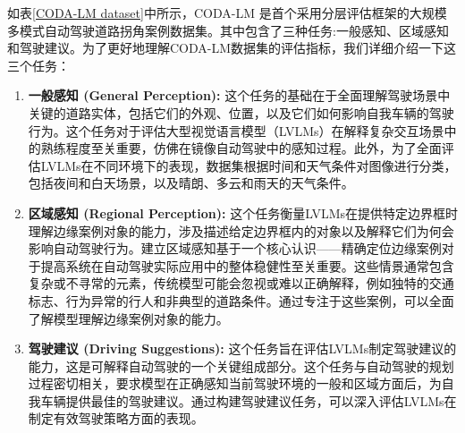 \documentclass[
    linespread = 1.25
]{ctexart}
\begin{document}
如表\ref{CODA-LM dataset}中所示，CODA-LM 是首个采用分层评估框架的大规模多模式自动驾驶道路拐角案例数据集。其中包含了三种任务:一般感知、区域感知和驾驶建议。为了更好地理解CODA-LM数据集的评估指标，我们详细介绍一下这三个任务：

\begin{enumerate}
  \item \textbf{一般感知 (General Perception):}
        这个任务的基础在于全面理解驾驶场景中关键的道路实体，包括它们的外观、位置，以及它们如何影响自我车辆的驾驶行为。这个任务对于评估大型视觉语言模型（LVLMs）在解释复杂交互场景中的熟练程度至关重要，仿佛在镜像自动驾驶中的感知过程。此外，为了全面评估LVLMs在不同环境下的表现，数据集根据时间和天气条件对图像进行分类，包括夜间和白天场景，以及晴朗、多云和雨天的天气条件。

  \item \textbf{区域感知 (Regional Perception):}
        这个任务衡量LVLMs在提供特定边界框时理解边缘案例对象的能力，涉及描述给定边界框内的对象以及解释它们为何会影响自动驾驶行为。建立区域感知基于一个核心认识——精确定位边缘案例对于提高系统在自动驾驶实际应用中的整体稳健性至关重要。这些情景通常包含复杂或不寻常的元素，传统模型可能会忽视或难以正确解释，例如独特的交通标志、行为异常的行人和非典型的道路条件。通过专注于这些案例，可以全面了解模型理解边缘案例对象的能力。

  \item \textbf{驾驶建议 (Driving Suggestions):}
        这个任务旨在评估LVLMs制定驾驶建议的能力，这是可解释自动驾驶的一个关键组成部分。这个任务与自动驾驶的规划过程密切相关，要求模型在正确感知当前驾驶环境的一般和区域方面后，为自我车辆提供最佳的驾驶建议。通过构建驾驶建议任务，可以深入评估LVLMs在制定有效驾驶策略方面的表现。
\end{enumerate}
\end{document}
